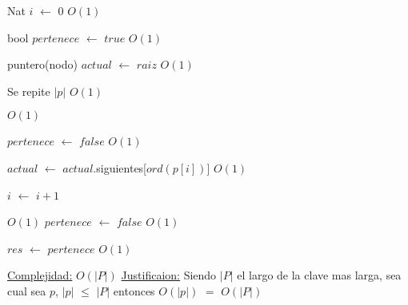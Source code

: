 \begin{Algoritmos}
\begin{algorithm}[H]
\begin{algorithmic}[1]
\State Nat $i$ $\gets$ $0$ \Comment $O(1)$

\State bool $pertenece$ $\gets$ $true$ \Comment $O(1)$

\State puntero(nodo) $actual$ $\gets$ $raiz$ \Comment $O(1)$ 

   \Comment Se repite $|p|$ $O(1)$
		
	
	 \Comment $O(1)$

		\State $pertenece$ $\gets$ $false$ \Comment $O(1)$	 
	
	\EndIf
	
	\State $actual$ $\gets$ $actual$.siguientes[$ord(p[i])$] \Comment $O(1)$

	\State $i$ $\gets$ $i + 1$
\EndWhile 

 \Comment $O(1)$ 
	\State $pertenece$ $\gets$ $false$ \Comment $O(1)$
\EndIf

\State $res$ $\gets$ $pertenece$ \Comment $O(1)$ 

\medskip
\State \underline{Complejidad:} $O(|P|)$
\State \underline{Justificaion:} Siendo $|P|$ el largo de la clave mas larga, sea cual sea $p$, $|p|$ $\leq$ $|P|$ entonces 	$O(|p|)$ $=$ $O(|P|)$

\end{algorithmic}
\end{algorithm}
  
\end{Algoritmos}


